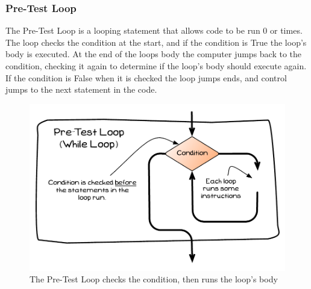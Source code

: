 \clearpage
\subsubsection{Pre-Test Loop} %
\label{sub:pre_test_loop}

The Pre-Test Loop is a looping statement that allows code to be run 0 or times. The loop checks the condition at the start, and if the condition is True the loop's body is executed. At the end of the loops body the computer jumps back to the condition, checking it again to determine if the loop's body should execute again. If the condition is False when it is checked the loop jumps ends, and control jumps to the next statement in the code.

\begin{figure}[h]
   \centering
   \includegraphics[width=\textwidth]{./topics/control-flow/diagrams/PreTestLoop} 
   \caption{The Pre-Test Loop checks the condition, then runs the loop's body}
   \label{fig:looping-pre-test}
\end{figure}



